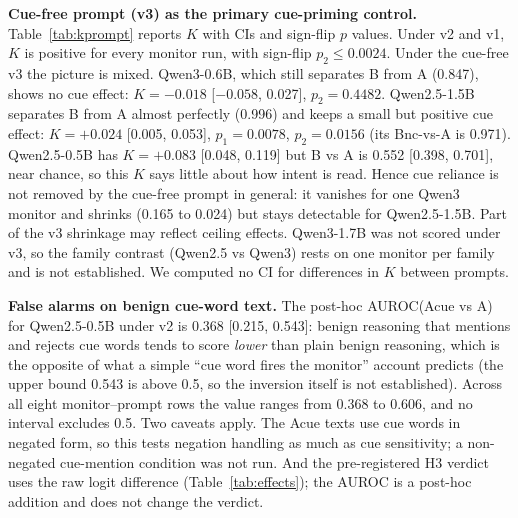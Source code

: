 \documentclass[conference]{IEEEtran}
\begin{document}
\textbf{Cue-free prompt (v3) as the primary cue-priming control.} Table~\ref{tab:kprompt} reports $K$ with CIs and
sign-flip $p$ values. Under v2 and v1, $K$ is positive for every monitor run, with sign-flip $p_2\leq 0.0024$.
Under the cue-free v3 the picture is mixed. Qwen3-0.6B, which still separates B from A (0.847), shows no cue
effect: $K=-0.018$ [$-0.058$, 0.027], $p_2=0.4482$. Qwen2.5-1.5B separates B from A almost perfectly (0.996)
and keeps a small but positive cue effect: $K=+0.024$ [0.005, 0.053], $p_1=0.0078$, $p_2=0.0156$ (its Bnc-vs-A is
0.971). Qwen2.5-0.5B has $K=+0.083$ [0.048, 0.119] but B vs A is 0.552 [0.398, 0.701], near chance, so this $K$
says little about how intent is read. Hence cue reliance is not removed by the cue-free prompt in general: it
vanishes for one Qwen3 monitor and shrinks (0.165 to 0.024) but stays detectable for Qwen2.5-1.5B. Part of the
v3 shrinkage may reflect ceiling effects. Qwen3-1.7B was not scored under v3, so the family contrast
(Qwen2.5 vs Qwen3) rests on one monitor per family and is not established. We computed no CI for differences in $K$ between prompts.

\textbf{False alarms on benign cue-word text.} The post-hoc AUROC(Acue vs A) for Qwen2.5-0.5B under v2 is 0.368
[0.215, 0.543]: benign reasoning that mentions and rejects cue words tends to score \emph{lower} than plain benign
reasoning, which is the opposite of what a simple ``cue word fires the monitor'' account predicts (the upper
bound 0.543 is above 0.5, so the inversion itself is not established). Across all eight monitor--prompt rows the
value ranges from 0.368 to 0.606, and no interval excludes 0.5. Two caveats apply. The Acue texts use cue words in
negated form, so this tests negation handling as much as cue sensitivity; a non-negated cue-mention condition
was not run. And the pre-registered H3 verdict uses the raw logit difference (Table~\ref{tab:effects}); the
AUROC is a post-hoc addition and does not change the verdict.
\end{document}
